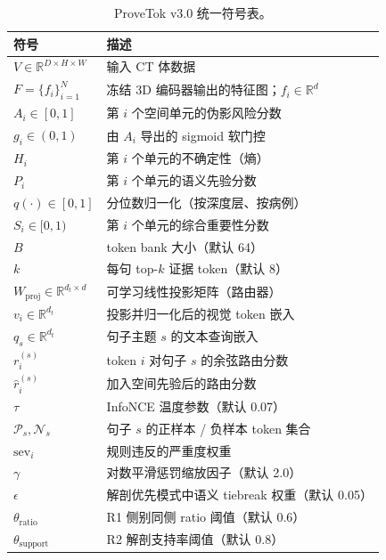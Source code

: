 \documentclass[11pt,a4paper]{article}
\newcommand{\RR}{\mathbb{R}}
\theoremstyle{definition}
\begin{document}
\begin{table}[ht]
\centering\small
\begin{tabularx}{\linewidth}{lX}
\toprule
\textbf{符号} & \textbf{描述} \\
\midrule
$V \in \RR^{D \times H \times W}$ & 输入 CT 体数据 \\
$F = \{f_i\}_{i=1}^{N}$ & 冻结 3D 编码器输出的特征图；$f_i \in \RR^d$ \\
$A_i \in [0,1]$ & 第 $i$ 个空间单元的伪影风险分数 \\
$g_i \in (0,1)$ & 由 $A_i$ 导出的 sigmoid 软门控 \\
$H_i$ & 第 $i$ 个单元的不确定性（熵） \\
$P_i$ & 第 $i$ 个单元的语义先验分数 \\
$q(\cdot) \in [0,1]$ & 分位数归一化（按深度层、按病例） \\
$S_i \in [0,1)$ & 第 $i$ 个单元的综合重要性分数 \\
$B$ & token bank 大小（默认 64） \\
$k$ & 每句 top-$k$ 证据 token（默认 8） \\
$W_{\mathrm{proj}} \in \RR^{d_t \times d}$ & 可学习线性投影矩阵（路由器） \\
$v_i \in \RR^{d_t}$ & 投影并归一化后的视觉 token 嵌入 \\
$q_s \in \RR^{d_t}$ & 句子主题 $s$ 的文本查询嵌入 \\
$r_i^{(s)}$ & token $i$ 对句子 $s$ 的余弦路由分数 \\
$\hat{r}_i^{(s)}$ & 加入空间先验后的路由分数 \\
$\tau$ & InfoNCE 温度参数（默认 0.07） \\
$\mathcal{P}_s, \mathcal{N}_s$ & 句子 $s$ 的正样本 / 负样本 token 集合 \\
$\mathrm{sev}_i$ & 规则违反的严重度权重 \\
$\gamma$ & 对数平滑惩罚缩放因子（默认 2.0） \\
$\epsilon$ & 解剖优先模式中语义 tiebreak 权重（默认 0.05） \\
$\theta_{\mathrm{ratio}}$ & R1 侧别同侧 ratio 阈值（默认 0.6） \\
$\theta_{\mathrm{support}}$ & R2 解剖支持率阈值（默认 0.8） \\
\bottomrule
\end{tabularx}
\caption{ProveTok v3.0 统一符号表。}
\label{tab:notation}
\end{table}


\end{document}
